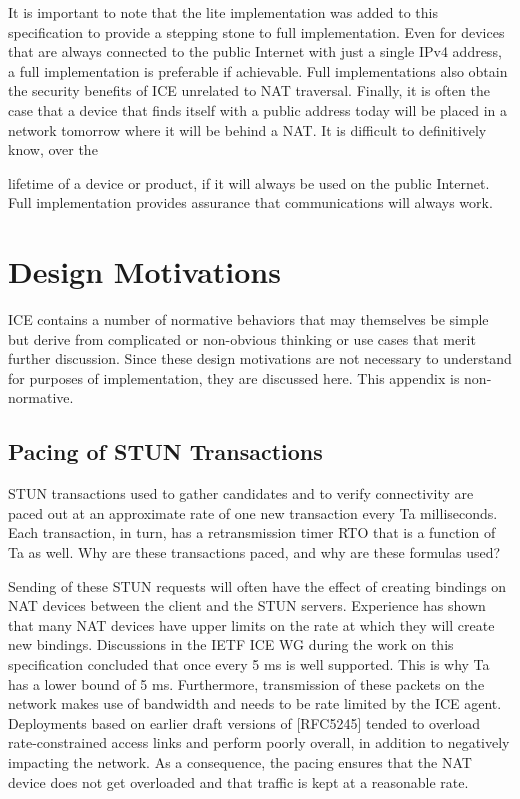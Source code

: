 \documentclass{article}
\begin{document}
It is important to note that the lite implementation was added to this specification to provide a stepping stone to full implementation.  Even for devices that are always connected to the public Internet with just a single IPv4 address, a full implementation is preferable if achievable.  Full implementations also obtain the security benefits of ICE unrelated to NAT traversal. Finally, it is often the case that a device that finds itself with a public address today will be placed in a network tomorrow where it will be behind a NAT.  It is difficult to definitively know, over the

lifetime of a device or product, if it will always be used on the public Internet.  Full implementation provides assurance that communications will always work.

\section{Design Motivations}

ICE contains a number of normative behaviors that may themselves be simple but derive from complicated or non-obvious thinking or use cases that merit further discussion.  Since these design motivations are not necessary to understand for purposes of implementation, they are discussed here.  This appendix is non-normative.

\subsection{Pacing of STUN Transactions}

STUN transactions used to gather candidates and to verify connectivity are paced out at an approximate rate of one new transaction every Ta milliseconds.  Each transaction, in turn, has a retransmission timer RTO that is a function of Ta as well.  Why are these transactions paced, and why are these formulas used?

Sending of these STUN requests will often have the effect of creating bindings on NAT devices between the client and the STUN servers. Experience has shown that many NAT devices have upper limits on the rate at which they will create new bindings.  Discussions in the IETF ICE WG during the work on this specification concluded that once every 5 ms is well supported.  This is why Ta has a lower bound of 5 ms.  Furthermore, transmission of these packets on the network makes use of bandwidth and needs to be rate limited by the ICE agent. Deployments based on earlier draft versions of [RFC5245] tended to overload rate-constrained access links and perform poorly overall, in addition to negatively impacting the network.  As a consequence, the pacing ensures that the NAT device does not get overloaded and that traffic is kept at a reasonable rate.
\end{document}
